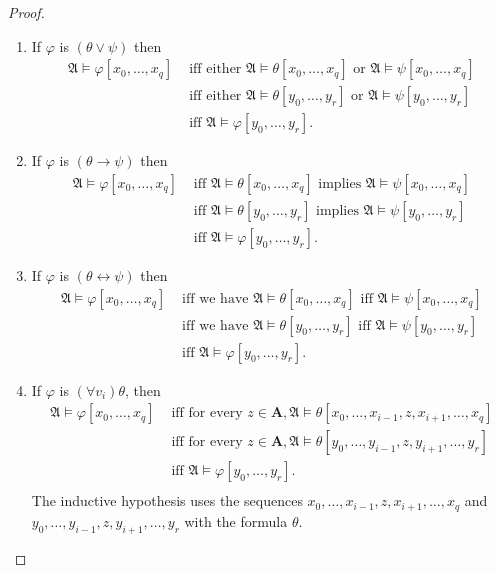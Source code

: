 \documentclass[titlepage, oneside]{amsbook}
\theoremstyle{plain}
\theoremstyle{definition}
\theoremstyle{remark}
\newcommand{\ma}{\ensuremath{\mathfrak{A}}}
\newcommand{\ba}{\ensuremath{\mathbf{A}}}
\newcommand{\ynot}[2][0]{\ensuremath{ y_{#1} , \dots , y_{#2}}}
\begin{document}
\begin{proof}
\begin{enumerate}
\item If $\varphi$ is $(\theta \vee \psi)$ then 
\[ \begin{aligned}
\mathfrak{A} \models \varphi [x_{0} ,\dots ,x_{q}] & \mbox{ iff either } 
\mathfrak{A} \models \theta [x_{0}, \dots , x_{q}] \mbox{ or } 
\mathfrak{A} \models \psi [x_{0}, \dots , x_{q}] \\
& \mbox{ iff either }
\mathfrak{A} \models \theta [y_{0}, \dots , y_{r}] \mbox{ or }
\mathfrak{A} \models \psi [y_{0}, \dots , y_{r}] \\
& \mbox{ iff } \mathfrak{A} \models \varphi [y_{0} ,\dots ,y_{r}].
\end{aligned} \]
\item If $\varphi $ is $( \theta  \to \psi) $ then
\[ \begin{aligned}
\mathfrak{A} \models \varphi [x_{0} ,\dots ,x_{q}] & \mbox{ iff  } 
\mathfrak{A} \models \theta [x_{0}, \dots , x_{q}] \mbox{ implies } 
\mathfrak{A} \models \psi [x_{0}, \dots , x_{q}] \\
& \mbox{ iff  }
\mathfrak{A} \models \theta [y_{0}, \dots , y_{r}] \mbox{ implies }
\mathfrak{A} \models \psi [y_{0}, \dots , y_{r}] \\
& \mbox{ iff } \mathfrak{A} \models \varphi [y_{0} ,\dots ,y_{r}]  .
\end{aligned} \]

\item If $\varphi $ is $( \theta  \leftrightarrow \psi) $ then
\[ \begin{aligned}
\mathfrak{A} \models \varphi [x_{0} ,\dots ,x_{q}] & \mbox{ iff we have  } 
\mathfrak{A} \models \theta [x_{0}, \dots , x_{q}] \mbox{ iff } 
\mathfrak{A} \models \psi [x_{0}, \dots , x_{q}] \\
& \mbox{ iff we have }
\mathfrak{A} \models \theta [y_{0}, \dots , y_{r}] \mbox{ iff }
\mathfrak{A} \models \psi [y_{0}, \dots , y_{r}] \\
& \mbox{ iff } \mathfrak{A} \models \varphi [y_{0} ,\dots ,y_{r}].
\end{aligned} \]

\item If $\varphi$ is $(\forall v_{i}) \theta$, then  
\[\begin{aligned} \mathfrak{A} \models \varphi [x_{0} , \dots , x_{q}]
&\mbox{ iff for 
every } z \in \mathbf{A}, \mathfrak{A} \models \theta [x_{0}, \dots , 
x_{i-1}, z, x_{i+1} , \dots , x_{q}]\\
&\mbox{ iff for every } z \in \ba, \ma \models \theta [\ynot{i-1}, z ,
y_{i+1}, \dots , y_r] \\
&\mbox{ iff } \ma \models \varphi [\ynot{r}] .\\
\end{aligned} \]
The inductive hypothesis uses the sequences $ x_0, \dots ,
x_{i-1}, z, x_{i+1}, \dots , x_{q}$ and $ y_0 , \dots , y_{i-1} , z,
y_{i+1} , \dots , y_r $ with the formula $\theta$.


\end{enumerate}
\end{proof}
\end{document}
